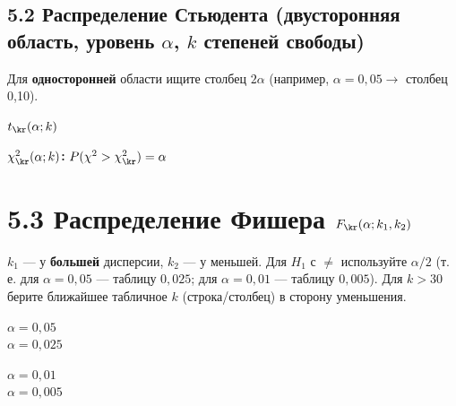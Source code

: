 \subsection*{5.2 Распределение Стьюдента (двусторонняя область, уровень $\alpha$, $k$ степеней свободы)}
Для \textbf{односторонней} области ищите столбец $2\alpha$ (например, $\alpha=0{,}05\to$ столбец 0,10).\\[2pt]
\scriptsize\renewcommand{\arraystretch}{0.88}\setlength{\tabcolsep}{4pt}
\begin{minipage}[t]{0.47\textwidth}\centering
\textbf{$t_\kr(\alpha;k)$}\\[2pt]
\end{minipage}\hfill
\begin{minipage}[t]{0.5\textwidth}\centering
\textbf{$\chi^2_\kr(\alpha;k)$:} $P(\chi^2>\chi^2_\kr)=\alpha$\\[2pt]
\end{minipage}
\normalsize

\newpage
\section*{5.3 Распределение Фишера $F_\kr(\alpha;k_1,k_2)$}
$k_1$ --- у \textbf{большей} дисперсии, $k_2$ --- у меньшей. Для $H_1$ с $\ne$ используйте $\alpha/2$ (т.\,е. для $\alpha=0{,}05$ --- таблицу $0{,}025$; для $\alpha=0{,}01$ --- таблицу $0{,}005$). Для $k>30$ берите ближайшее табличное $k$ (строка/столбец) в сторону уменьшения.\\
\scriptsize\renewcommand{\arraystretch}{0.86}\setlength{\tabcolsep}{2.6pt}
\begin{center}
\textbf{$\alpha=0{,}05$}\\[1pt]
\textbf{$\alpha=0{,}025$}\\[1pt]
\end{center}
\newpage
\scriptsize\renewcommand{\arraystretch}{0.86}\setlength{\tabcolsep}{2.6pt}
\begin{center}
\textbf{$\alpha=0{,}01$}\\[1pt]
\textbf{$\alpha=0{,}005$}\\[1pt]
\end{center}

